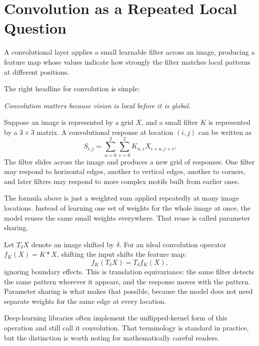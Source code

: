 \section{Convolution as a Repeated Local Question}

\begin{definition}
A convolutional layer applies a small learnable filter across an image, producing a feature map whose values indicate how strongly the filter matches local patterns at different positions.
\end{definition}

The right headline for convolution is simple:

\begin{center}
\emph{Convolution matters because vision is local before it is global.}
\end{center}

Suppose an image is represented by a grid $X$, and a small filter $K$ is represented by a $3 \times 3$ matrix. A convolutional response at location $(i,j)$ can be written as
\[
S_{i,j} = \sum_{u=0}^{2}\sum_{v=0}^{2} K_{u,v} X_{i+u,j+v}.
\]
The filter slides across the image and produces a new grid of responses. One filter may respond to horizontal edges, another to vertical edges, another to corners, and later filters may respond to more complex motifs built from earlier ones.

\begin{prereqbridge}
The formula above is just a weighted sum applied repeatedly at many image locations. Instead of learning one set of weights for the whole image at once, the model reuses the same small weights everywhere. That reuse is called parameter sharing.
\end{prereqbridge}

\begin{mathlens}
Let \(T_\delta X\) denote an image shifted by \(\delta\). For an ideal convolution operator \(f_K(X)=K * X\), shifting the input shifts the feature map:
\[
f_K(T_\delta X)=T_\delta f_K(X),
\]
ignoring boundary effects. This is translation equivariance: the same filter detects the same pattern wherever it appears, and the response moves with the pattern. Parameter sharing is what makes that possible, because the model does not need separate weights for the same edge at every location.
\end{mathlens}

Deep-learning libraries often implement the unflipped-kernel form of this operation and still call it convolution. That terminology is standard in practice, but the distinction is worth noting for mathematically careful readers.

